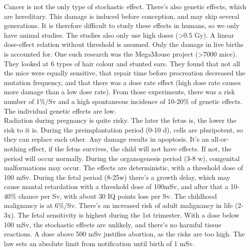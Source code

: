 Cancer is not the only type of stochastic effect. There's also genetic effects, which are hereditary. This damage is induced before conception, and may skip several generations. It is therefore difficult to study these effects in humans, so we only have animal studies. The studies also only use high doses (>0.5 Gy). A linear dose-effect relation without threshold is assumed. Only the damage in live births is accounted for. One such research was the MegaMouse project (>7000 mice). They looked at 6 types of hair colour and stunted ears. They found that not all the mice were equally sensitive, that repair time before procreation decreased the mutation frequency, and that there was a dose rate effect (high dose rate causes more damage than a low dose rate). From those experiments, there was a risk number of 1\%/Sv and a high spontaneous incidence of 10-20\% of genetic effects. The individual genetic effects are low. \\
Radiation during pregnancy is quite risky. The later the fetus is, the lower the risk to it is. During the preimplantation period (0-10 d), cells are pluripotent, so they can replace each other. Any damage results in apoptosis. It's an all-or-nothing effect, if the fetus survives, the child will not have effects. If not, the period will occur normally. During the organogenesis period (3-8 w), congenital malformations may occur. The effects are deterministic, with a threshold dose of 100 mSv. During the fetal period (8-25w) there's a growth delay, which may cause mantal retardation with a threshold dose of 100mSv, and after that a 10-40\% chance per Sv, with about 30 IQ points loss per Sv. The childhood malignancy is at 6\%/Sv. There's an increased risk of adult malignancy in life (2-3x). The fetal sensitivity is highest during the 1st trimester. With a dose below 100 mSv, the stochastic effects are unlikely, and there's no harmful tissue reactions. A dose above 500 mSv justifies abortion, as the risks are too high. The law sets an absolute limit from notification until birth of 1 mSv.

